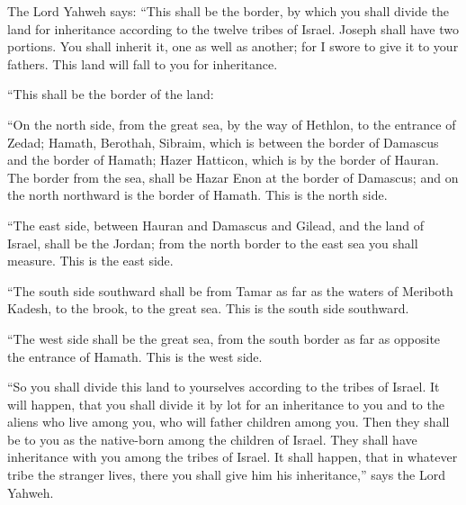 {\par }{\PP {}The Lord Yahweh says: “This shall be the border, by which you shall divide the land for inheritance according to the twelve tribes of Israel. Joseph shall have two portions.
You shall inherit it, one as well as another; for I swore to give it to your fathers. This land will fall to you for inheritance.
\par }{\PP {}“This shall be the border of the land:
\par }{\PP “On the north side, from the great sea, by the way of Hethlon, to the entrance of Zedad;
Hamath, Berothah, Sibraim, which is between the border of Damascus and the border of Hamath; Hazer Hatticon, which is by the border of Hauran.
The border from the sea, shall be Hazar Enon at the border of Damascus; and on the north northward is the border of Hamath. This is the north side.
\par }{\PP {}“The east side, between Hauran and Damascus and Gilead, and the land of Israel, shall be the Jordan; from the north border to the east sea you shall measure. This is the east side.
\par }{\PP {}“The south side southward shall be from Tamar as far as the waters of Meriboth Kadesh, to the brook, to the great sea. This is the south side southward.
\par }{\PP {}“The west side shall be the great sea, from the south border as far as opposite the entrance of Hamath. This is the west side.
\par }{\PP {}“So you shall divide this land to yourselves according to the tribes of Israel.
It will happen, that you shall divide it by lot for an inheritance to you and to the aliens who live among you, who will father children among you. Then they shall be to you as the native-born among the children of Israel. They shall have inheritance with you among the tribes of Israel.
It shall happen, that in whatever tribe the stranger lives, there you shall give him his inheritance,” says the Lord Yahweh.

}
